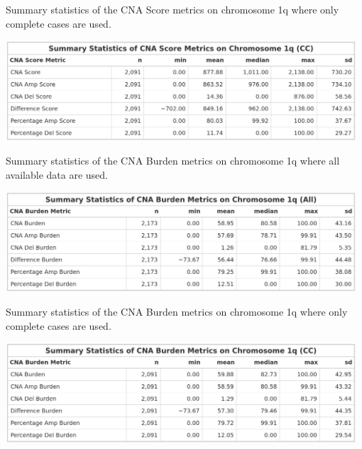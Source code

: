 \begin{table}[!ht]
\center
\caption[Summary statistics of the CNA Score metrics on chromosome 1q where only complete cases are used.]{Summary statistics of the CNA Score metrics on chromosome 1q where only complete cases are used.}
\includegraphics[width = 0.98\textwidth]{../tables/Chapter_2/CNA_Score_Metric_CCA_Chr1q_Summary.png}
\label{tab:Score_CCA_Chr1q}
\end{table}

\begin{table}[!ht]
\center
\caption[Summary statistics of the CNA Burden metrics on chromosome 1q where all available data are used.]{Summary statistics of the CNA Burden metrics on chromosome 1q where all available data are used.}
\includegraphics[width = 0.98\textwidth]{../tables/Chapter_2/CNA_Burden_Metric_All_Chr1q_Summary.png}
\label{tab:Burden_All_Chr1q}
\end{table}

\begin{table}[!ht]
\center
\caption[Summary statistics of the CNA Burden metrics on chromosome 1q where only complete cases are used.]{Summary statistics of the CNA Burden metrics on chromosome 1q where only complete cases are used.}
\includegraphics[width = 0.98\textwidth]{../tables/Chapter_2/CNA_Burden_Metric_CCA_Chr1q_Summary.png}
\label{tab:Burden_CCA_Chr1q}
\end{table}

